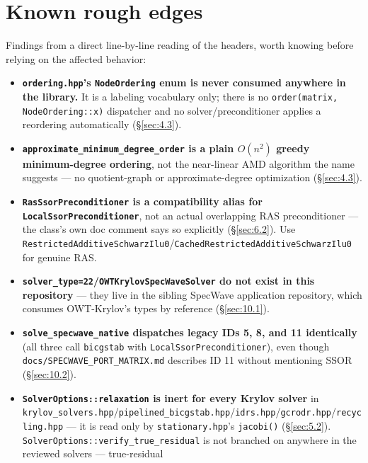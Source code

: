 \documentclass[11pt,a4paper]{report}
\newcommand{\secref}[1]{\S\ref{#1}}
\begin{document}
\chapter{Known rough edges}
\label{sec:14}

Findings from a direct line-by-line reading of the headers, worth
knowing before relying on the affected behavior:

\begin{itemize}
\item \textbf{\texttt{ordering.hpp}'s \lstinline!NodeOrdering! enum is
  never consumed anywhere in the library.} It is a labeling
  vocabulary only; there is no \lstinline!order(matrix, NodeOrdering::x)!
  dispatcher and no solver/preconditioner applies a reordering
  automatically (\secref{sec:4.3}).
\item \textbf{\lstinline!approximate_minimum_degree_order! is a plain
  $O(n^2)$ greedy minimum-degree ordering}, not the near-linear AMD
  algorithm the name suggests --- no quotient-graph or
  approximate-degree optimization (\secref{sec:4.3}).
\item \textbf{\lstinline!RasSsorPreconditioner! is a compatibility alias
  for \lstinline!LocalSsorPreconditioner!}, not an actual overlapping RAS
  preconditioner --- the class's own doc comment says so explicitly
  (\secref{sec:6.2}). Use
  \lstinline!RestrictedAdditiveSchwarzIlu0!/\lstinline!CachedRestrictedAdditiveSchwarzIlu0!
  for genuine RAS.
\item \textbf{\lstinline!solver_type=22!/\lstinline!OWTKrylovSpecWaveSolver! do
  not exist in this repository} --- they live in the sibling SpecWave
  application repository, which consumes OWT-Krylov's types by
  reference (\secref{sec:10.1}).
\item \textbf{\lstinline!solve_specwave_native! dispatches legacy IDs 5,
  8, and 11 identically} (all three call \lstinline!bicgstab! with
  \lstinline!LocalSsorPreconditioner!), even though
  \texttt{docs/SPECWAVE\_PORT\_MATRIX.md} describes ID 11 without
  mentioning SSOR (\secref{sec:10.2}).
\item \textbf{\lstinline!SolverOptions::relaxation! is inert for every
  Krylov solver} in
  \texttt{krylov\_solvers.hpp}/\texttt{pipelined\_bicgstab.hpp}/\texttt{idrs.hpp}/\texttt{gcrodr.hpp}/\texttt{recycling.hpp}
  --- it is read only by \texttt{stationary.hpp}'s \lstinline!jacobi()!
  (\secref{sec:5.2}). \lstinline!SolverOptions::verify_true_residual! is
  not branched on anywhere in the reviewed solvers --- true-residual

\end{itemize}
\end{document}
